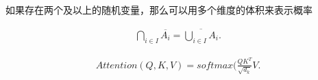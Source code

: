 \begin{thm}
		[概率与几何概率]
		如果存在两个及以上的随机变量，那么可以用多个维度的体积来表示概率
\end{thm}
\begin{thm}
\begin{align*}
		\bigcap_{i \in  I} \overline{A_i}  = \overline{\bigcup_{i \in  I} A_i}
.\end{align*}
\end{thm}
\begin{thm}
		\begin{align*}
				Attention(Q,K,V) = softmax (\frac{QK^T}{\sqrt{d_k} } V
		.\end{align*}
\end{thm}


\ifx\allfiles\undefined

\fi

